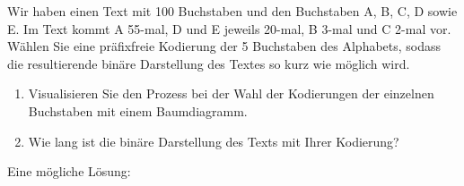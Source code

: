 \begin{myexercise}
	Wir haben einen Text mit 100 Buchstaben und den Buchstaben A, B, C, D sowie E. Im Text kommt A 55-mal, D und E jeweils 20-mal, B 3-mal und C 2-mal vor. Wählen Sie eine präfixfreie Kodierung der 5 Buchstaben des Alphabets, sodass die resultierende binäre Darstellung des Textes so kurz wie möglich wird.
	\begin{enumerate}
		\item Visualisieren Sie den Prozess bei der Wahl der Kodierungen der einzelnen Buchstaben mit einem Baumdiagramm.
		\item  Wie lang ist die binäre Darstellung des Texts mit Ihrer Kodierung?
	\end{enumerate}
	\begin{myanswer}
		Eine mögliche Lösung:
		\begin{figure}[H]
			\centering
\end{figure}
\end{myanswer}
\end{myexercise}
